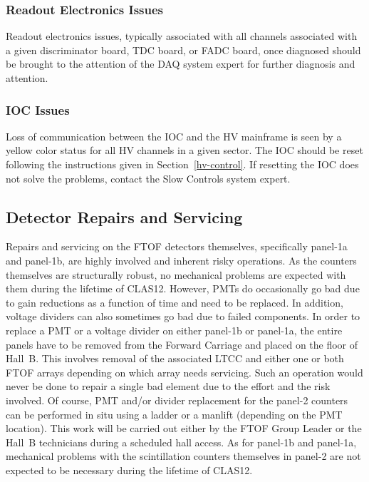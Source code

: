 \documentclass[letterpaper,10pt]{article}
\begin{document}
\subsubsection{Readout Electronics Issues}
\label{readout-issues}

Readout electronics issues, typically associated with all channels associated with a given
discriminator board, TDC board, or FADC board, once diagnosed should be brought to the
attention of the DAQ system expert for further diagnosis and attention.

\subsubsection{IOC Issues}
\label{ioc-issues}

Loss of communication between the IOC and the HV mainframe is seen by a yellow color status for
all HV channels in a given sector. The IOC should be reset following the instructions given in
Section~\ref{hv-control}. If resetting the IOC does not solve the problems, contact the 
Slow Controls system expert.

\subsection{Detector Repairs and Servicing}

Repairs and servicing on the FTOF detectors themselves, specifically panel-1a and panel-1b, are 
highly involved and inherent risky operations. As the counters themselves are structurally robust, 
no mechanical problems are expected with them during the lifetime of CLAS12. However, PMTs do 
occasionally go bad due to gain reductions as a function of time and need to be replaced. In addition, 
voltage dividers can also sometimes go bad due to failed components. In order to replace a PMT or a 
voltage divider on either panel-1b or panel-1a, the entire panels have to be removed from the Forward 
Carriage and placed on the floor of Hall~B. This involves removal of the associated LTCC and either 
one or both FTOF arrays depending on which array needs servicing. Such an operation would never be 
done to repair a single bad element due to the effort and the risk involved. Of course, PMT and/or 
divider replacement for the panel-2 counters can be performed in situ using a ladder or a manlift 
(depending on the PMT location). This work will be carried out either by the FTOF Group Leader or 
the Hall~B technicians during a scheduled hall access. As for panel-1b and panel-1a, mechanical 
problems with the scintillation counters themselves in panel-2 are not expected to be necessary 
during the lifetime of CLAS12.
\end{document}
